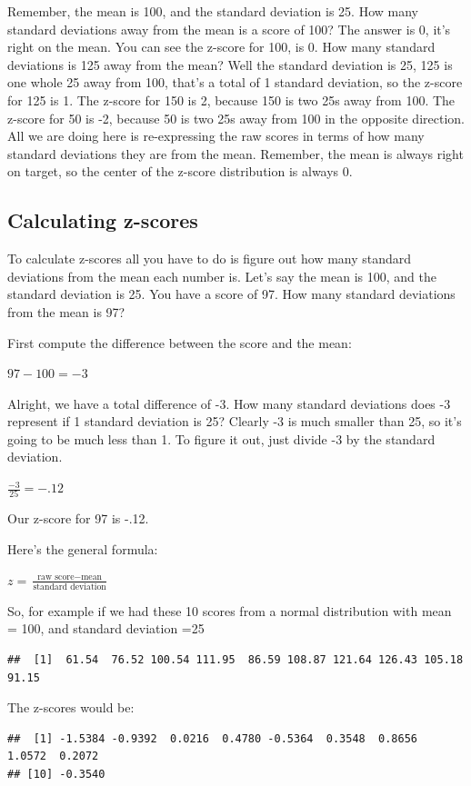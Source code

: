 \documentclass[
]{book}
\begin{document}
Remember, the mean is 100, and the standard deviation is 25. How many standard deviations away from the mean is a score of 100? The answer is 0, it's right on the mean. You can see the z-score for 100, is 0. How many standard deviations is 125 away from the mean? Well the standard deviation is 25, 125 is one whole 25 away from 100, that's a total of 1 standard deviation, so the z-score for 125 is 1. The z-score for 150 is 2, because 150 is two 25s away from 100. The z-score for 50 is -2, because 50 is two 25s away from 100 in the opposite direction. All we are doing here is re-expressing the raw scores in terms of how many standard deviations they are from the mean. Remember, the mean is always right on target, so the center of the z-score distribution is always 0.

\subsection{Calculating z-scores}\label{calculating-z-scores}

To calculate z-scores all you have to do is figure out how many standard deviations from the mean each number is. Let's say the mean is 100, and the standard deviation is 25. You have a score of 97. How many standard deviations from the mean is 97?

First compute the difference between the score and the mean:

\(97-100 = -3\)

Alright, we have a total difference of -3. How many standard deviations does -3 represent if 1 standard deviation is 25? Clearly -3 is much smaller than 25, so it's going to be much less than 1. To figure it out, just divide -3 by the standard deviation.

\(\frac{-3}{25} = -.12\)

Our z-score for 97 is -.12.

Here's the general formula:

\(z = \frac{\text{raw score} - \text{mean}}{\text{standard deviation}}\)

So, for example if we had these 10 scores from a normal distribution with mean = 100, and standard deviation =25

\begin{verbatim}
##  [1]  61.54  76.52 100.54 111.95  86.59 108.87 121.64 126.43 105.18  91.15
\end{verbatim}

The z-scores would be:

\begin{verbatim}
##  [1] -1.5384 -0.9392  0.0216  0.4780 -0.5364  0.3548  0.8656  1.0572  0.2072
## [10] -0.3540
\end{verbatim}
\end{document}
